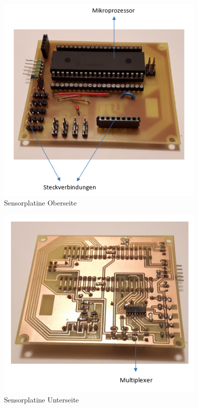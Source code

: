\begin{figure}[tbh]
\begin{centering}
\includegraphics[width = 100mm]{Bilder/HP_Top_Beschriftung}
\par\end{centering}
\caption{Sensorplatine Oberseite}
\label{Sensor Platine oben}
\end{figure}


\begin{figure}[tbh]
\begin{centering}
\includegraphics[width=100mm]{Bilder/HP_Bottom_Beschriftung}
\par\end{centering}
\caption{Sensorplatine Unterseite}
\label{Sensor Platine unten}
\end{figure}